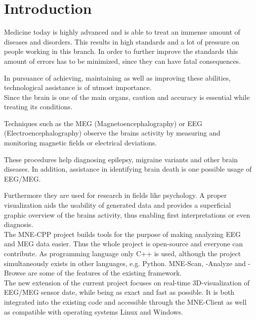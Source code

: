 
\section{Introduction}

	Medicine today is highly advanced and is able to treat an immense amount of diseases and disorders.
	This results in high standards and a lot of pressure on people working in this branch. In order to further improve the 			standards this amount of errors has to be minimized, since they can have fatal consequences.

	In pursuance of achieving, maintaining as well as improving these abilities, technological assistance is of utmost 				importance.\\  

	Since the brain is one of the main organs, caution and accuracy is essential while treating its conditions. 
	
	Techniques such as the MEG (Magnetoencephalography) or EEG (Electroencephalography) observe the brains activity by 				measuring and monitoring magnetic fields or electrical deviations.

	These procedures help diagnosing epilepsy, migraine variants and other brain diseases. In addition, assistance in 				identifying brain death is one possible usage of EEG/MEG.
	 
	Furthermore they are used for research in fields like psychology.
	A proper visualization aids the usability of generated data and provides a superficial graphic overview of the brains 			activity, thus enabling first interpretations or even diagnosis.\\
	

	The MNE-CPP  project builds tools for the purpose of making analyzing EEG and MEG data easier.
	Thus the whole project is open-source and everyone can contribute. As programming language only C++ is used, although the project 			simultaneously exists in other languages, e.g. Python. 
	MNE-Scan, -Analyze and -Browse are some of the features of the existing framework. \\

	The new extension of the current project focuses on real-time 3D-visualization of EEG/MEG sensor date, while being as 		exact and fast as possible. It is both integrated into the existing code and accessible through the MNE-Client as well as 			compatible with operating systems Linux and Windows.
  
